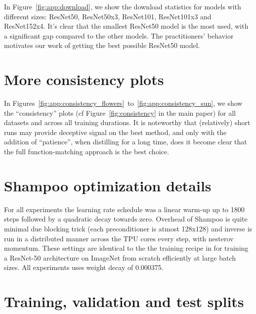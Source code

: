\documentclass[10pt,twocolumn,letterpaper]{article}
\begin{document}
In Figure~\ref{fig:app:download}, we show the download statistics for models with different sizes: ResNet50, ResNet50x3, ResNet101, ResNet101x3 and ResNet152x4. 
It's clear that the smallest ResNet50 model is the most used, with a significant gap compared to the other models.
The practitioners' behavior motivates our work of getting the best possible ResNet50 model.

\section{More consistency plots}\label{sec:app:consistency}

In Figures~\ref{fig:app:consistency_flowers}~to~\ref{fig:app:consistency_sun}, we show the ``consistency'' plots (cf Figure~\ref{fig:consistency} in the main paper) for all datasets and across all training durations.
It is noteworthy that (relatively) short runs may provide deceptive signal on the best method, and only with the addition of ``patience'', \eg when distilling for a long time, does it become clear that the full function-matching approach is the best choice.
\section{Shampoo optimization details}\label{sec:app:shampoo}
For all experiments the learning rate schedule was a linear warm-up up to 1800 steps followed by a quadratic decay towards zero. Overhead of Shampoo is quite minimal due blocking trick (each preconditioner is atmost 128x128) and inverse is run in a distributed manner across the TPU cores every step, with nesterov momentum. These settings are identical to the the training recipe in \cite{anil2021scalable} for training a ResNet-50 architecture on ImageNet from scratch efficiently at large batch sizes.  All experiments uses weight decay of 0.000375. 

\section{Training, validation and test splits}\label{app:splits}
\end{document}
